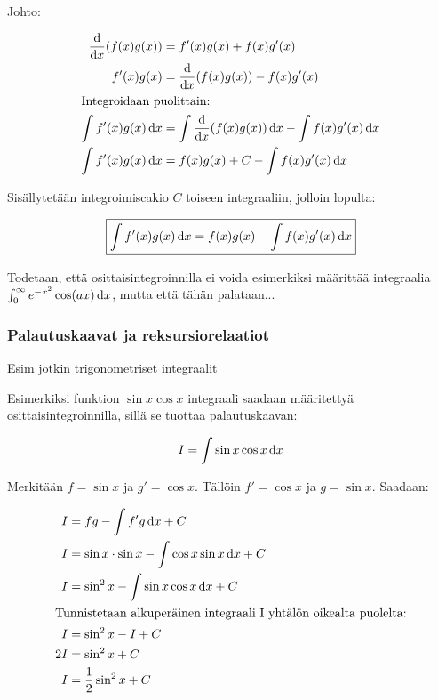 \documentclass[../integrointiopas.tex]{subfiles}
\begin{document}
	Johto:
	
	\begin{align}
		\odv{}{x}(f(x)g(x)) &= f'(x)g(x) + f(x)g'(x) \\
		f'(x)g(x) &= \odv{}{x}(f(x)g(x)) - f(x)g'(x) \\
		\intertext{Integroidaan puolittain:}
		\int f'(x)g(x)\odif{x} &= \int\odv{}{x}(f(x)g(x))\odif{x} - \int f(x)g'(x)\odif{x} \\
		\int f'(x)g(x)\odif{x} &= f(x)g(x) + C - \int f(x)g'(x)\odif{x}
	\end{align}
	
	\noindent Sisällytetään integroimiscakio $C$ toiseen integraaliin, jolloin lopulta:
	
	\begin{equation}
		\boxed{\int f'(x)g(x)\odif{x} = f(x)g(x) - \int f(x)g'(x)\odif{x}}
	\end{equation}

	Todetaan, että osittaisintegroinnilla ei voida esimerkiksi määrittää integraalia $\int_{0}^{\infty}e^{-x^2}\cos(ax)\odif{x}$, mutta että tähän palataan...
	
	\subsubsection{Palautuskaavat ja reksursiorelaatiot}
	
	Esim jotkin trigonometriset integraalit
	
	Esimerkiksi funktion $\sin x \cos x$ integraali saadaan määritettyä osittaisintegroinnilla, sillä se tuottaa palautuskaavan:
	
	\begin{equation*}
		I = \int\sin x \cos x\odif{x}
	\end{equation*}

	Merkitään $f = \sin x$ ja $g' = \cos x$. Tällöin $f' = \cos x$ ja $g = \sin x$. Saadaan:
	
	\begin{align*}
		I &= fg - \int f'g\odif{x} + C \\
		I &= \sin x\cdot \sin x - \int \cos x\sin x \odif{x} + C \\
		I &= \sin^2 x - \int \sin x\cos x \odif{x} + C \\
		\intertext{Tunnistetaan alkuperäinen integraali I yhtälön oikealta puolelta:}
		I &= \sin^2 x - I + C \\
		2I &= \sin^2 x + C \\
		I &= \frac{1}{2}\sin^2x + C
	\end{align*}
\end{document}
